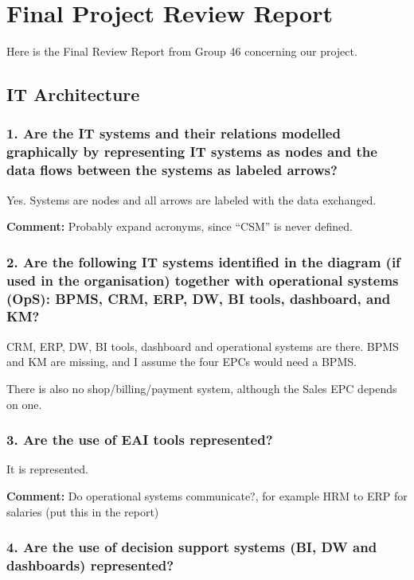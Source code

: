 \documentclass{article}
\begin{document}
\appendix

\section{Final Project Review Report}
Here is the Final Review Report from Group 46 concerning our project.

\subsection{IT Architecture}

\subsubsection*{1. Are the IT systems and their relations modelled graphically by representing IT systems as nodes and the data flows between the systems as labeled arrows?}

Yes. Systems are nodes and all arrows are labeled with the data exchanged.

\textbf{Comment:} Probably expand acronyms, since ``CSM'' is never defined.

\subsubsection*{2. Are the following IT systems identified in the diagram (if used in the organisation) together with operational systems (OpS): BPMS, CRM, ERP, DW, BI tools, dashboard, and KM?}

CRM, ERP, DW, BI tools, dashboard and operational systems are there. BPMS and KM are missing, and I assume the four EPCs would need a BPMS.

There is also no shop/billing/payment system, although the Sales EPC depends on one.

\subsubsection*{3. Are the use of EAI tools represented?}

It is represented.

\textbf{Comment:} Do operational systems communicate?, for example HRM to ERP for salaries (put this in the report)

\subsubsection*{4. Are the use of decision support systems (BI, DW and dashboards) represented?}
\end{document}
